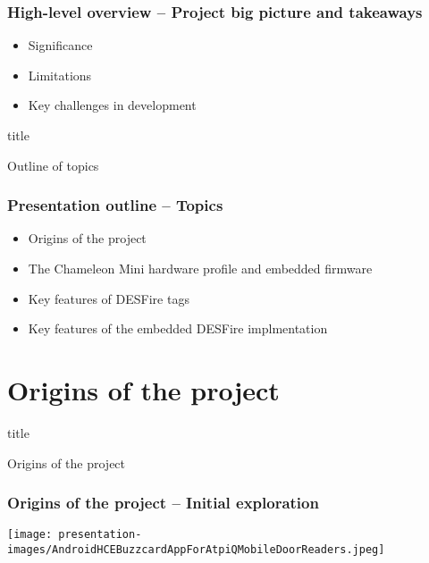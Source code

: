 \documentclass[usenames,svgnames,dvipsnames,11pt]{beamer}
\newcommand{\TitleBoxed}[1]{
     \begin{beamercolorbox}[sep=8pt,center,shadow=true,rounded=true]{title}
          \usebeamerfont{title}#1\par%
     \end{beamercolorbox}
}
\begin{document}
\begin{frame}
\frametitle{High-level overview -- Project big picture and takeaways}

\begin{itemize} 

\item Significance 
\item Limitations 
\item Key challenges in development

\end{itemize} 

\end{frame}

\begin{frame}
\TitleBoxed{
     \Huge{\centerline{Outline of topics}}
}
\end{frame}

\begin{frame}
\frametitle{Presentation outline -- Topics}
\begin{itemize} 

\item Origins of the project 
\item The Chameleon Mini hardware profile and embedded firmware
\item Key features of DESFire tags
\item Key features of the embedded DESFire implmentation 

\end{itemize} 

\end{frame}

\section{Origins of the project}

\begin{frame}
\TitleBoxed{
     \Huge{\centerline{Origins of the project}}
}
\end{frame}

\begin{frame}
\frametitle{Origins of the project -- Initial exploration}

\begin{center}
\texttt{[image: presentation-images/AndroidHCEBuzzcardAppForAtpiQMobileDoorReaders.jpeg]}
\end{center}

\end{frame}
\end{document}
